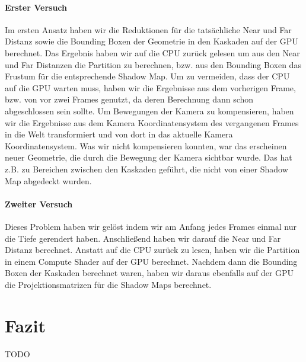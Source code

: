 \documentclass[runningheaders,a4paper]{llncs}
\begin{document}
\paragraph{Erster Versuch}
Im ersten Ansatz haben wir die Reduktionen für die tatsächliche Near und Far Distanz sowie die Bounding Boxen der Geometrie in den Kaskaden auf der GPU berechnet.
Das Ergebnis haben wir auf die CPU zurück gelesen um aus den Near und Far Distanzen die Partition zu berechnen, bzw. aus den Bounding Boxen das Frustum für die entsprechende Shadow Map.
Um zu vermeiden, dass der CPU auf die GPU warten muss, haben wir die Ergebnisse aus dem vorherigen Frame, bzw. von vor zwei Frames genutzt, da deren Berechnung dann schon abgeschlossen sein sollte.
Um Bewegungen der Kamera zu kompensieren, haben wir die Ergebnisse aus dem Kamera Koordinatensystem des vergangenen Frames in die Welt transformiert und von dort in das aktuelle Kamera Koordinatensystem.
Was wir nicht kompensieren konnten, war das erscheinen neuer Geometrie, die durch die Bewegung der Kamera sichtbar wurde.
Das hat z.B. zu Bereichen zwischen den Kaskaden geführt, die nicht von einer Shadow Map abgedeckt wurden.

\paragraph{Zweiter Versuch}
Dieses Problem haben wir gelöst indem wir am Anfang jedes Frames einmal nur die Tiefe gerendert haben.
Anschließend haben wir darauf die Near und Far Distanz berechnet.
Anstatt auf die CPU zurück zu lesen, haben wir die Partition in einem Compute Shader auf der GPU berechnet.
Nachdem dann die Bounding Boxen der Kaskaden berechnet waren, haben wir daraus ebenfalls auf der GPU die Projektionsmatrizen für die Shadow Maps berechnet.


\section{Fazit}

	TODO



\end{document}
